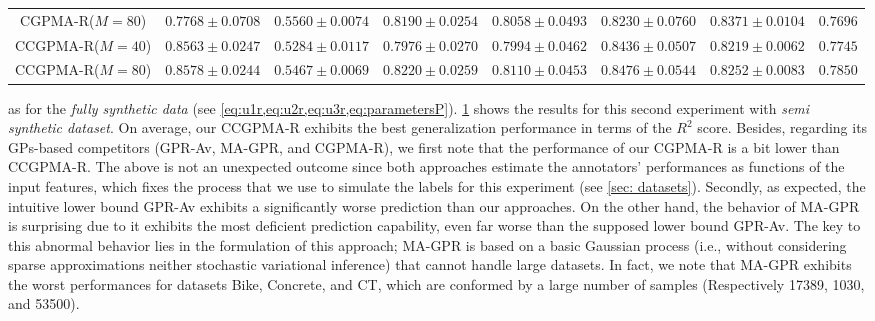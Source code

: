 \documentclass[journal]{IEEEtran}
\begin{document}
\begin{table}[!htb]
{\begin{tabular}{cccccccc}
        CGPMA-R($M=80$) &$0.7768\pm0.0708$ & $0.5560\pm0.0074$ & $0.8190\pm0.0254$ & $0.8058\pm0.0493$ & $0.8230\pm0.0760$ & $0.8371\pm0.0104$ & $0.7696$\\ 
        CCGPMA-R($M=40$)&$0.8563\pm0.0247$ & $0.5284\pm0.0117$ & $0.7976\pm0.0270$ & $0.7994\pm0.0462$ & $0.8436\pm0.0507$ & $0.8219\pm0.0062$ & $0.7745$\\ 
        CCGPMA-R($M=80$)&$\mathbf{0.8578\pm0.0244}$ & $0.5467\pm0.0069$ & $\mathbf{0.8220\pm0.0259}$ & $\mathbf{0.8110\pm0.0453}$ & $\mathbf{0.8476\pm0.0544}$ & $0.8252\pm0.0083$ & $\mathbf{0.7850}$\\\bottomrule
	\end{tabular}}
	\label{tab:SSRegResults}
\end{table}
as for the \textit{fully synthetic data} (see \cref{eq:u1r,eq:u2r,eq:u3r,eq:parametersP}). \cref{tab:SSRegResults} shows the results for this second experiment with \textit{semi synthetic dataset}. On average, our CCGPMA-R  exhibits the best generalization performance in terms of the $R^2$ score. Besides, regarding its GPs-based competitors (GPR-Av, MA-GPR, and CGPMA-R), we first note that the performance of our CGPMA-R is a bit lower than CCGPMA-R. The above is not an unexpected outcome since both approaches estimate the annotators' performances as functions of the input features, which fixes the process that we use to simulate the labels for this experiment (see \cref{sec: datasets}). Secondly, as expected, the intuitive lower bound GPR-Av exhibits a significantly worse prediction than our approaches. On the other hand, the behavior of MA-GPR is surprising due to it exhibits the most deficient prediction capability, even far worse than the supposed lower bound GPR-Av. The key to this abnormal behavior lies in the formulation of this approach; MA-GPR is based on a basic Gaussian process (i.e., without considering sparse approximations neither stochastic variational inference) that cannot handle large datasets. In fact, we note that MA-GPR exhibits the worst performances for datasets Bike, Concrete, and CT, which are conformed by a large number of samples (Respectively 17389, 1030, and 53500).
\end{document}
